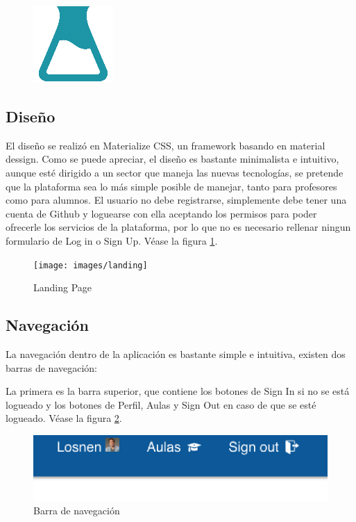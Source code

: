 \begin{figure}[!th]
\begin{center}
\includegraphics[scale=1.0]{images/probeta}
\end{center}
\end{figure}

\subsection{Diseño}
\label{3:5:1}

El diseño se realizó en Materialize CSS, un framework basando en material dessign. Como se puede apreciar, el diseño es bastante minimalista e intuitivo, aunque esté dirigido a un sector que maneja las nuevas tecnologías, se pretende que la plataforma sea lo más simple posible de manejar, tanto para profesores como para alumnos.
El usuario no debe registrarse, simplemente debe tener una cuenta de Github y loguearse con ella aceptando los permisos para poder ofrecerle los servicios de la plataforma, por lo que no es necesario rellenar ningun formulario de Log in o Sign Up. 
Véase la figura \ref{fig:Landing page}.

\begin{figure}[!th]
\begin{center}
\texttt{[image: images/landing]}
\caption{Landing Page}
\label{fig:Landing page}
\end{center}
\end{figure}

\newpage

\subsection{Navegación}
\label{3:5:2}

La navegación dentro de la aplicación es bastante simple e intuitiva, existen dos barras de navegación:

La primera es la barra superior, que contiene los botones de Sign In si no se está logueado y los botones de Perfil, Aulas y Sign Out en caso de que se esté logueado.
Véase la figura \ref{fig:Barra de navegacion}.

\begin{figure}[!th]
\begin{center}
\includegraphics[scale=0.8]{images/nav}
\caption{Barra de navegación}
\label{fig:Barra de navegacion}
\end{center}
\end{figure}

